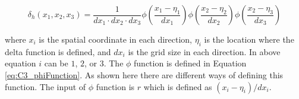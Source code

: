 \begin{equation}\label{eq:C3_regularizedDeltaFunction}
    \delta_h(x_1, x_2, x_3) = \frac{1}{dx_1 \cdot dx_2 \cdot dx_3}
                               \phi \left( \frac{x_1 - \eta_1}{dx_1} \right)
                               \phi \left( \frac{x_2 - \eta_2}{dx_2} \right)
                               \phi \left( \frac{x_2 - \eta_3}{dx_3} \right)
\end{equation}

where $x_i$ is the spatial coordinate in each direction, $\eta_i$ is the location where the delta function is defined, and $dx_i$ is the grid size in each direction. In above equation $i$ can be $1$, $2$, or $3$. The $\phi$ function is defined in Equation \eqref{eq:C3_phiFunction}. As shown here there are different ways of defining this function. The input of $\phi$ function is $r$ which is defined as $(x_i - \eta_i) / dx_i$.

